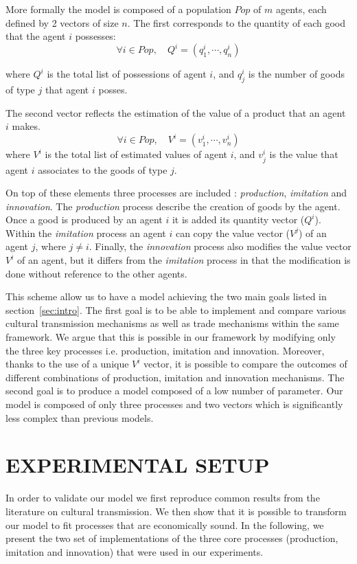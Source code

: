 \documentclass{wscpaperproc}
\begin{document}
More formally the model is composed of a population $Pop$ of $m$ agents, each defined by 2 vectors of size $n$. The first corresponds to the quantity of each good that the agent $i$ possesses: 
$$\forall i \in Pop, \quad Q^i = (q^i_1,\cdots,q^i_n) $$

where $Q^i$ is the total list of possessions of agent $i$, and $q^i_j$ is the number of goods of type $j$ that agent $i$ posses.

The second vector reflects the estimation of the value of a product that an agent $i$ makes.
$$\forall i \in Pop, \quad V^i = (v^i_1,\cdots,v^i_n) $$
where $V^i$ is the total list of estimated values of agent $i$, and $v^i_j$ is the value that agent $i$ associates to the goods of type $j$.

On top of these elements three processes are included : \textit{production}, \textit{imitation} and \textit{innovation}. The \textit{production} process describe the creation of goods by the agent. Once a good is produced by an agent $i$ it is added its quantity vector ($Q^i$). Within the \textit{imitation} process an agent $i$ can copy the value vector ($V^j$) of an agent $j$, where $j \neq i$. Finally, the \textit{innovation} process also modifies the value vector $V^i$ of an agent, but it differs from the \emph{imitation} process in that the modification is done without reference to the other agents. 

This scheme allow us to have a model achieving the two main goals listed in section~\ref{sec:intro}. The first goal is to be able to implement and compare various cultural transmission mechanisms as well as trade mechanisms within the same framework. We argue that this is possible in our framework by modifying only the three key processes i.e. production, imitation and innovation. Moreover, thanks to the use of a unique $V^i$ vector, it is possible to compare the outcomes of different combinations of production, imitation and innovation mechanisms. The second goal is to produce a model composed of a low number of parameter. Our model is composed of only three processes and two vectors which is significantly less complex than previous models.


\section{EXPERIMENTAL SETUP}


In order to validate our model we first reproduce common results from the literature on cultural transmission. We then show that it is possible to transform our model to fit processes that are economically sound. In the following, we present the two set of implementations of the three core processes (production, imitation and innovation) that were used in our experiments.
\end{document}
